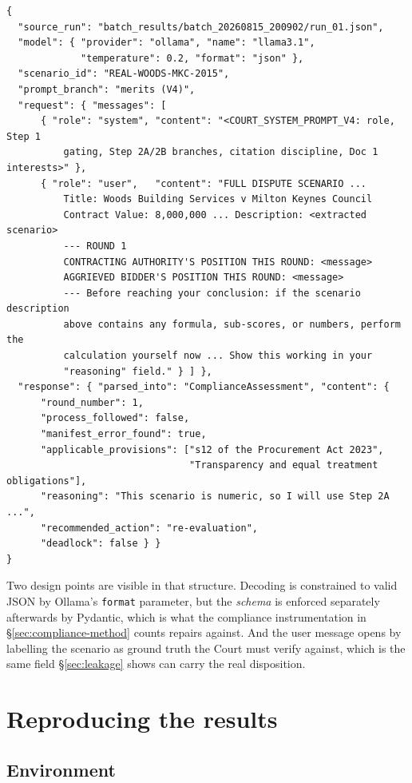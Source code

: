 \begin{lstlisting}
{
  "source_run": "batch_results/batch_20260815_200902/run_01.json",
  "model": { "provider": "ollama", "name": "llama3.1",
             "temperature": 0.2, "format": "json" },
  "scenario_id": "REAL-WOODS-MKC-2015",
  "prompt_branch": "merits (V4)",
  "request": { "messages": [
      { "role": "system", "content": "<COURT_SYSTEM_PROMPT_V4: role, Step 1
          gating, Step 2A/2B branches, citation discipline, Doc 1 interests>" },
      { "role": "user",   "content": "FULL DISPUTE SCENARIO ...
          Title: Woods Building Services v Milton Keynes Council
          Contract Value: 8,000,000 ... Description: <extracted scenario>
          --- ROUND 1
          CONTRACTING AUTHORITY'S POSITION THIS ROUND: <message>
          AGGRIEVED BIDDER'S POSITION THIS ROUND: <message>
          --- Before reaching your conclusion: if the scenario description
          above contains any formula, sub-scores, or numbers, perform the
          calculation yourself now ... Show this working in your
          "reasoning" field." } ] },
  "response": { "parsed_into": "ComplianceAssessment", "content": {
      "round_number": 1,
      "process_followed": false,
      "manifest_error_found": true,
      "applicable_provisions": ["s12 of the Procurement Act 2023",
                                "Transparency and equal treatment obligations"],
      "reasoning": "This scenario is numeric, so I will use Step 2A ...",
      "recommended_action": "re-evaluation",
      "deadlock": false } }
}
\end{lstlisting}

Two design points are visible in that structure. Decoding is constrained to valid
JSON by Ollama's \texttt{format} parameter, but the \emph{schema} is enforced
separately afterwards by Pydantic, which is what the compliance instrumentation in
\S\ref{sec:compliance-method} counts repairs against. And the user message opens by
labelling the scenario as ground truth the Court must verify against, which is the
same field \S\ref{sec:leakage} shows can carry the real disposition.

\chapter{Reproducing the results}
\label{app:repro}

\section{Environment}

